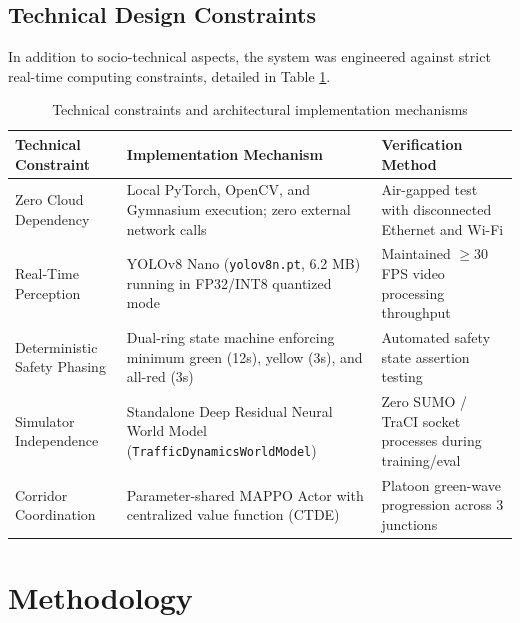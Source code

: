 \documentclass[12pt,a4paper,oneside]{report}
\begin{document}
\subsection{Technical Design Constraints}
In addition to socio-technical aspects, the system was engineered against strict real-time computing constraints, detailed in Table \ref{tab:technical_constraints}.

\begin{table}[htbp]
\centering
\small
\caption{Technical constraints and architectural implementation mechanisms}
\label{tab:technical_constraints}
\begin{tabularx}{\textwidth}{|p{3.5cm}|p{6.0cm}|X|}
\hline
\textbf{Technical Constraint} & \textbf{Implementation Mechanism} & \textbf{Verification Method} \\ \hline
Zero Cloud Dependency & Local PyTorch, OpenCV, and Gymnasium execution; zero external network calls & Air-gapped test with disconnected Ethernet and Wi-Fi \\ \hline
Real-Time Perception & YOLOv8 Nano (\texttt{yolov8n.pt}, 6.2 MB) running in FP32/INT8 quantized mode & Maintained $\ge 30$ FPS video processing throughput \\ \hline
Deterministic Safety Phasing & Dual-ring state machine enforcing minimum green (12s), yellow (3s), and all-red (3s) & Automated safety state assertion testing \\ \hline
Simulator Independence & Standalone Deep Residual Neural World Model (\texttt{TrafficDynamicsWorldModel}) & Zero SUMO / TraCI socket processes during training/eval \\ \hline
Corridor Coordination & Parameter-shared MAPPO Actor with centralized value function (CTDE) & Platoon green-wave progression across 3 junctions \\ \hline
\end{tabularx}
\end{table}

\section{Methodology}
\label{sec:methodology}
\end{document}
